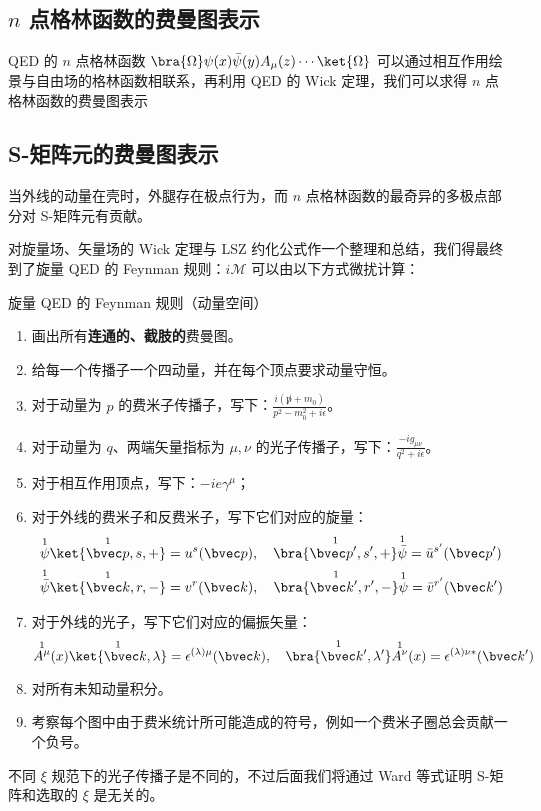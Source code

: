 
\subsection{$n$ 点格林函数的费曼图表示}
QED 的 $n$ 点格林函数 $\bra{\Omega} \psi(x)\bar\psi(y)A_\mu(z) \cdots \ket{\Omega}$ 可以通过相互作用绘景与自由场的格林函数相联系，再利用 QED 的 Wick 定理，我们可以求得 $n$ 点格林函数的费曼图表示

\subsection{S-矩阵元的费曼图表示}

当外线的动量在壳时，外腿存在极点行为，而 $n$ 点格林函数的最奇异的多极点部分对 S-矩阵元有贡献。

对旋量场、矢量场的 Wick 定理与 LSZ 约化公式作一个整理和总结，我们得最终到了旋量 QED 的 Feynman 规则：$i\mathcal{M}$ 可以由以下方式微扰计算：
\begin{theorem}{旋量 QED 的 Feynman 规则（动量空间）}

\begin{enumerate}
\item 画出所有\textbf{连通的、截肢的}费曼图。
\item 给每一个传播子一个四动量，并在每个顶点要求动量守恒。
\item 对于动量为 $p$ 的费米子传播子，写下：$\frac{i(\not p+m_0)}{p^2-m_0^2 + i\epsilon}$。
\item 对于动量为 $q$、两端矢量指标为 $\mu,\nu$ 的光子传播子，写下：$\frac{-ig_{\mu\nu}}{q^2 + i\epsilon}$。
\item 对于相互作用顶点，写下：$-ie\gamma^\mu$；
\item 对于外线的费米子和反费米子，写下它们对应的旋量：
\begin{align*}
&\overset{1}{\psi}\overset{1}{\ket{\bvec p,s,+}}=u^s(\bvec p),\quad \overset{1}{\bra{\bvec p',s',+}} \overset{1}{\bar\psi}=\bar u^{s'}(\bvec p')\\
&\overset{1}{\bar\psi}\overset{1}{\ket{\bvec k,r,-}}=v^{r}(\bvec k),\quad \overset{1}{\bra{\bvec k',r',-}} \overset{1}{\psi}=\bar v^{r'}(\bvec k')
\end{align*}
\item 对于外线的光子，写下它们对应的偏振矢量：
\[
\overset{1}{A^\mu}(x) \overset{1}{\ket{\bvec k,\lambda}}=\epsilon^{(\lambda)\mu}(\bvec k),\quad \overset{1}{\bra{\bvec k',\lambda'}}\overset{1}{A^\nu}(x)=\epsilon^{(\lambda)\nu*}(\bvec k')
\]
\item 
对所有未知动量积分。
\item 
考察每个图中由于费米统计所可能造成的符号，例如一个费米子圈总会贡献一个负号。
\end{enumerate}
\end{theorem}
不同 $\xi$ 规范下的光子传播子是不同的，不过后面我们将通过 Ward 等式证明 S-矩阵和选取的 $\xi$ 是无关的。
